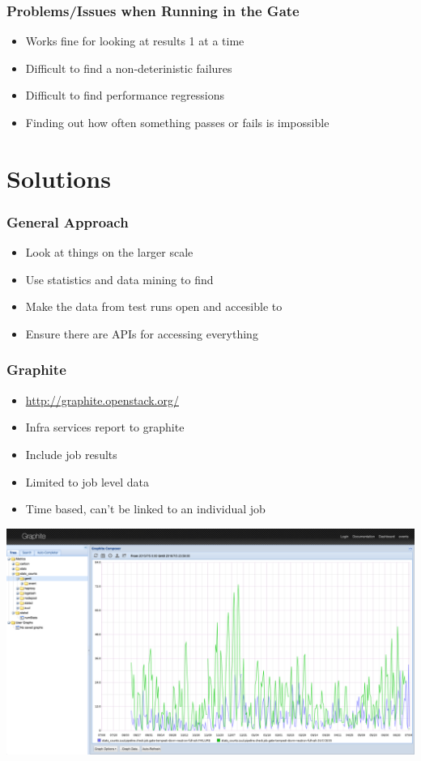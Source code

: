 \documentclass[aspectratio=43,11pt,hyperref={colorlinks=true}]{beamer}
\begin{document}
\begin{frame}
  \frametitle{Problems/Issues when Running in the Gate}
  \begin{itemize}
    \item Works fine for looking at results 1 at a time
    \item Difficult to find a non-deterinistic failures
    \item Difficult to find performance regressions
    \item Finding out how often something passes or fails is impossible
  \end{itemize}
\end{frame}

\section{Solutions}
\begin{frame}
  \frametitle{General Approach}
    \begin{itemize}
        \item Look at things on the larger scale
        \item Use statistics and data mining to find
        \item Make the data from test runs open and accesible to
        \item Ensure there are APIs for accessing everything
    \end{itemize}
\end{frame}

\begin{frame}
  \frametitle{Graphite}
  \begin{itemize}
    \item \href{http://graphite.openstack.org/}{http://graphite.openstack.org/}
    \item Infra services report to graphite
    \item Include job results
    \item Limited to job level data
    \item Time based, can't be linked to an individual job
  \end{itemize}
  \begin{center}
    \includegraphics[width=.65\textwidth]{graphite-sample.png}
  \end{center}
\end{frame}
\end{document}
